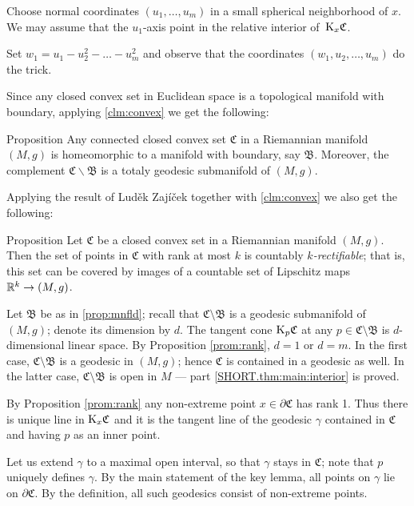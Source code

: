 \documentclass[a4paper,10pt]{article}
\begin{document}
Choose normal coordinates $(u_1,\dots, u_m)$ in a small spherical neighborhood of $x$.
We may assume that the $u_1$-axis point in the relative interior of~$\mathrm{K}_x\mathfrak{C}$.

Set $w_1=u_1-u_2^2-\dots-u_m^2$ and observe that the coordinates
$(w_1,u_2,\dots, u_m)$ do the trick.
\qeds

Since any closed convex set in Euclidean space is a topological manifold with boundary, applying \ref{clm:convex} we get the following:

\begin{thm}{Proposition}\label{prop:mnfld}
Any connected closed convex set $\mathfrak{C}$ in a Riemannian manifold $(M,g)$ is homeomorphic to a manifold with boundary, say $\mathfrak{B}$.
Moreover, the complement $\mathfrak{C}\backslash \mathfrak{B}$ is a totaly geodesic submanifold of $(M,g)$.
\end{thm}

Applying the result of Luděk 
Zajíček \cite{zajicek} 
together with \ref{clm:convex} we also get the following:

\begin{thm}{Proposition}\label{prop:rectifiable}
Let $\mathfrak{C}$ be a closed convex set in a Riemannian manifold $(M,g)$.
Then the set of points in $\mathfrak{C}$ with rank at most $k$ is countably \emph{$k$-rectifiable};
that is, this set can be  covered by images of a countable set of Lipschitz maps $\mathbb{R}^k\to (M,g)$.
\end{thm}

Let $\mathfrak B$ be as in \ref{prop:mnfld}; recall that $\mathfrak C\setminus \mathfrak B$ is a geodesic submanifold of $(M,g)$;
denote its dimension by $d$.
The tangent cone $\mathrm{K}_p \mathfrak C$ at any $p \in \mathfrak C\setminus \mathfrak B$ is $d$-dimensional linear space.
By Proposition \ref{prom:rank}, $d=1$ or $d=m$.
In the first case, $\mathfrak C\setminus \mathfrak B$ is a geodesic in $(M,g)$;
hence $\mathfrak C$ is contained in a geodesic as well.
In the latter case, $\mathfrak C\setminus \mathfrak B$ is open in $M$ --- part \ref{SHORT.thm:main:interior} is proved.

By Proposition \ref{prom:rank} any non-extreme point $x\in \partial \mathfrak C$ has rank 1.
Thus there is unique line in $\mathrm{K}_x\mathfrak C$ and it is the tangent line of the geodesic $\gamma$ contained in $\mathfrak C$ and having $p$ as an inner point. 

Let us extend $\gamma$ to a maximal open interval, so that $\gamma$ stays in $\mathfrak C$;
note that $p$ uniquely defines $\gamma$. 
By the main statement of the key lemma, all points on $\gamma$ lie on $\partial \mathfrak C$.
By the definition, all such geodesics consist of non-extreme points.
\end{document}

